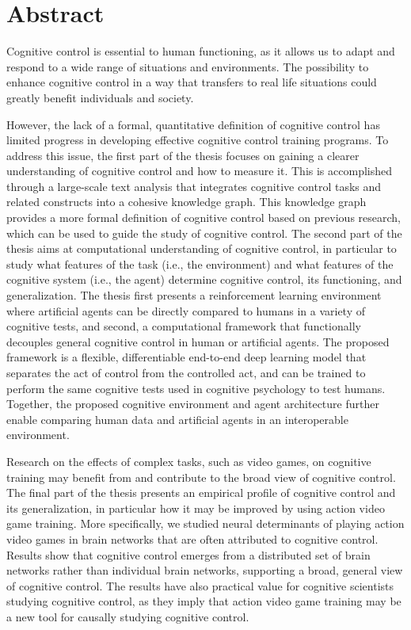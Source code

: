 
\section*{Abstract}

Cognitive control is essential to human functioning, as it allows us to adapt and respond to a wide range of situations and environments. The possibility to enhance cognitive control in a way that transfers to real life situations could greatly benefit individuals and society.

However, the lack of a formal, quantitative definition of cognitive control has limited progress in developing effective cognitive control training programs. To address this issue, the first part of the thesis focuses on gaining a clearer understanding of cognitive control and how to measure it. This is accomplished through a large-scale text analysis that integrates cognitive control tasks and related constructs into a cohesive knowledge graph. This knowledge graph provides a more formal definition of cognitive control based on previous research, which can be used to guide the study of cognitive control. The second part of the thesis aims at computational understanding of cognitive control, in particular to study what features of the task (i.e., the environment) and what features of the cognitive system (i.e., the agent) determine cognitive control, its functioning, and generalization. The thesis first presents a reinforcement learning environment where artificial agents can be directly compared to humans in a variety of cognitive tests, and second, a computational framework that functionally decouples general cognitive control in human or artificial agents. The proposed framework is a flexible, differentiable end-to-end deep learning model that separates the act of control from the controlled act, and can be trained to perform the same cognitive tests used in cognitive psychology to test humans. Together, the proposed cognitive environment and agent architecture further enable comparing human data and artificial agents in an interoperable environment.

Research on the effects of complex tasks, such as video games, on cognitive training may benefit from and contribute to the broad view of cognitive control. The final part of the thesis presents an empirical profile of cognitive control and its generalization, in particular how it may be improved by using action video game training. More specifically, we studied neural determinants of playing action video games in brain networks that are often attributed to cognitive control. Results show that cognitive control emerges from a distributed set of brain networks rather than individual brain networks, supporting a broad, general view of cognitive control. The results have also practical value for cognitive scientists studying cognitive control, as they imply that action video game training may be a new tool for causally studying cognitive control.

